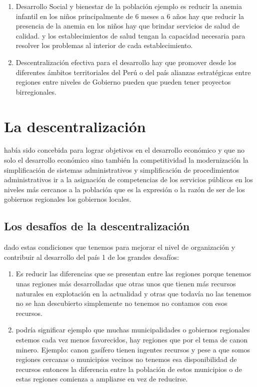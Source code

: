 \documentclass[
  a4paper,
]{article}
\begin{document}
\begin{enumerate}
\def\labelenumi{\arabic{enumi}.}
\setcounter{enumi}{3}
\item
  Desarrollo Social y bienestar de la población ejemplo es reducir la
  anemia infantil en los niños principalmente de 6 meses a 6 años hay
  que reducir la presencia de la anemia en los niños hay que brindar
  servicios de salud de calidad. y los establecimientos de salud tengan
  la capacidad necesaria para resolver los problemas al interior de cada
  establecimiento.
\item
  Descentralización efectiva para el desarrollo hay que promover desde
  los diferentes ámbitos territoriales del Perú o del país alianzas
  estratégicas entre regiones entre niveles de Gobierno pueden que
  pueden tener proyectos birregionales.
\end{enumerate}

\section{La descentralización}\label{la-descentralizaciuxf3n}

había sido concebida para lograr objetivos en el desarrollo económico y
que no solo el desarrollo económico sino también la competitividad la
modernización la simplificación de sistemas administrativos y
simplificación de procedimientos administrativos ir a la asignación de
competencias de los servicios públicos en los niveles más cercanos a la
población que es la expresión o la razón de ser de los gobiernos
regionales los gobiernos locales.

\subsection{Los desafíos de la
descentralización}\label{los-desafuxedos-de-la-descentralizaciuxf3n}

dado estas condiciones que tenemos para mejorar el nivel de organización
y contribuir al desarrollo del país 1 de los grandes desafíos:

\begin{enumerate}
\def\labelenumi{\arabic{enumi}.}
\item
  Es reducir las diferencias que se presentan entre las regiones porque
  tenemos unas regiones más desarrolladas que otras unos que tienen más
  recursos naturales en explotación en la actualidad y otras que todavía
  no las tenemos no se han descubierto simplemente no tenemos no
  contamos con esos recursos.
\item
  podría significar ejemplo que muchas municipalidades o gobiernos
  regionales estemos cada vez menos favorecidos, hay regiones que por el
  tema de canon minero. Ejemplo: canon gasífero tienen ingentes recursos
  y pese a que somos regiones cercanas o municipios vecinos no tenemos
  esa disponibilidad de recursos entonces la diferencia entre la
  población de estos municipios o de estas regiones comienza a ampliarse
  en vez de reducirse.
\end{enumerate}
\end{document}
